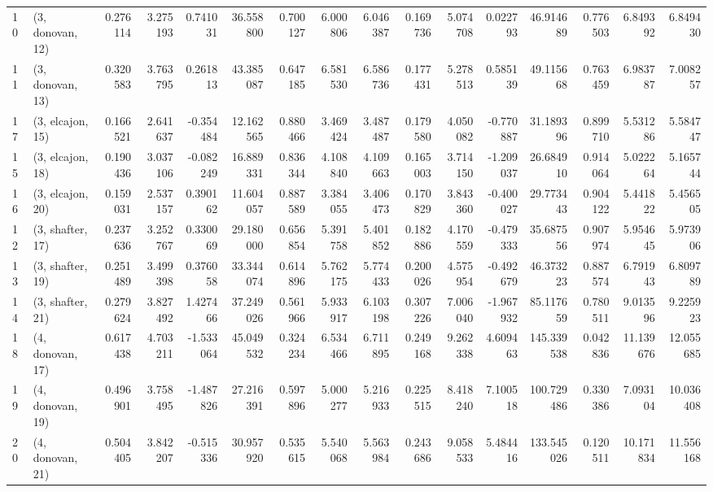 \begin{tabular}{llrrrrrrrrrrrrrr}
10 &  (3, donovan, 12) &   0.276114 &  3.275193 &  0.741031 &  36.558800 &  0.700127 &   6.000806 &  6.046387 &  0.169736 &  5.074708 &  0.022793 &   46.914689 &  0.776503 &   6.849392 &   6.849430 \\
11 &  (3, donovan, 13) &   0.320583 &  3.763795 &  0.261813 &  43.385087 &  0.647185 &   6.581530 &  6.586736 &  0.177431 &  5.278513 &  0.585139 &   49.115668 &  0.763459 &   6.983787 &   7.008257 \\
17 &  (3, elcajon, 15) &   0.166521 &  2.641637 & -0.354484 &  12.162565 &  0.880466 &   3.469424 &  3.487487 &  0.179580 &  4.050082 & -0.770887 &   31.189396 &  0.899710 &   5.531286 &   5.584747 \\
15 &  (3, elcajon, 18) &   0.190436 &  3.037106 & -0.082249 &  16.889331 &  0.836344 &   4.108840 &  4.109663 &  0.165003 &  3.714150 & -1.209037 &   26.684910 &  0.914064 &   5.022264 &   5.165744 \\
16 &  (3, elcajon, 20) &   0.159031 &  2.537157 &  0.390162 &  11.604057 &  0.887589 &   3.384055 &  3.406473 &  0.170829 &  3.843360 & -0.400027 &   29.773443 &  0.904122 &   5.441822 &   5.456505 \\
12 &  (3, shafter, 17) &   0.237636 &  3.252767 &  0.330069 &  29.180000 &  0.656854 &   5.391758 &  5.401852 &  0.182886 &  4.170559 & -0.479333 &   35.687556 &  0.907974 &   5.954645 &   5.973906 \\
13 &  (3, shafter, 19) &   0.251489 &  3.499398 &  0.376058 &  33.344074 &  0.614896 &   5.762175 &  5.774433 &  0.200026 &  4.575954 & -0.492679 &   46.373223 &  0.887574 &   6.791943 &   6.809789 \\
14 &  (3, shafter, 21) &   0.279624 &  3.827492 &  1.427466 &  37.249026 &  0.561966 &   5.933917 &  6.103198 &  0.307226 &  7.006040 & -1.967932 &   85.117659 &  0.780511 &   9.013596 &   9.225923 \\
18 &  (4, donovan, 17) &   0.617438 &  4.703211 & -1.533064 &  45.049532 &  0.324234 &   6.534466 &  6.711895 &  0.249168 &  9.262338 &  4.609463 &  145.339538 &  0.042836 &  11.139676 &  12.055685 \\
19 &  (4, donovan, 19) &   0.496901 &  3.758495 & -1.487826 &  27.216391 &  0.597896 &   5.000277 &  5.216933 &  0.225515 &  8.418240 &  7.100518 &  100.729486 &  0.330386 &   7.093104 &  10.036408 \\
20 &  (4, donovan, 21) &   0.504405 &  3.842207 & -0.515336 &  30.957920 &  0.535615 &   5.540068 &  5.563984 &  0.243686 &  9.058533 &  5.484416 &  133.545026 &  0.120511 &  10.171834 &  11.556168 \\

\end{tabular}

